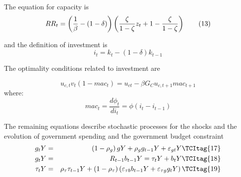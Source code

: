 \documentclass[thmsa,letterpaper]{article}
\begin{document}
The equation for capacity is%
\begin{equation}
RR_{t}=\left( \frac{1}{\beta }-\left( 1-\delta \right) \right) \left( \frac{%
\zeta }{1-\zeta }z_{t}+1-\frac{\zeta }{1-\zeta }\right)   \tag{13}
\end{equation}

and the definition of investment is%
\begin{equation}
i_{t}=k_{t}-\left( 1-\delta \right) k_{t-1}  \tag{14}
\end{equation}

The optimality conditions related to investment are

\begin{equation}
u_{c,t}v_{t}\left( 1-mac_{t}\right) =u_{ct}-\beta G_{C}u_{c,t+1}mac_{t+1} 
\tag{15}
\end{equation}%
where:%
\begin{equation}
mac_{t}=\frac{d\phi _{t}}{di_{t}}=\phi \left( i_{t}-i_{t-1}\right)   \tag{16}
\end{equation}

The remaining equations describe stochastic processes for the shocks and the
evolution of government spending and the government budget constraint%
\begin{eqnarray}
g_{t}Y &=&\left( 1-\rho _{g}\right) gY+\rho _{g}g_{t-1}Y+\varepsilon _{gt}Y 
\TCItag{17} \\
g_{t}Y &=&R_{t-1}b_{t-1}Y=\tau _{t}Y+b_{t}Y  \TCItag{18} \\
\tau _{t}Y &=&\rho _{\tau }\tau _{t-1}Y+\left( 1-\rho _{\tau }\right) \left(
\varepsilon _{\tau b}b_{t-1}Y+\varepsilon _{\tau g}g_{t}Y\right)  
\TCItag{19}
\end{eqnarray}
\end{document}
